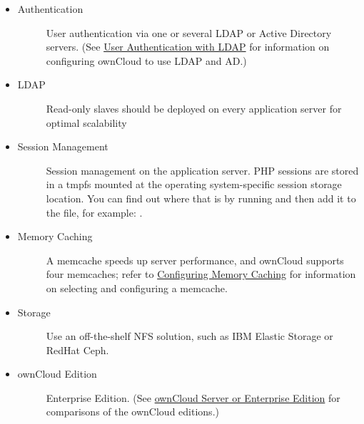 \documentclass[letterpaper,10pt,english]{sphinxmanual}
\begin{document}
\begin{itemize}
\item {} \begin{description}
\item[{Authentication}] \leavevmode
User authentication via one or several LDAP or Active Directory servers.
(See \href{https://doc.owncloud.org/server/9.0/admin\_manual/configuration\_user/user\_auth\_ldap.html}{User Authentication with LDAP}  for information on configuring
ownCloud to use LDAP and AD.)

\end{description}

\item {} \begin{description}
\item[{LDAP}] \leavevmode
Read-only slaves should be deployed on every application server for
optimal scalability

\end{description}

\item {} \begin{description}
\item[{Session Management}] \leavevmode
Session management on the application server. PHP sessions are stored
in a tmpfs mounted at the operating system-specific session storage
location. You can find out where that is by running  and then add it to the  file,
for example:
.

\end{description}

\item {} \begin{description}
\item[{Memory Caching}] \leavevmode
A memcache speeds up server performance, and ownCloud supports four
memcaches; refer to \href{https://doc.owncloud.org/server/9.0/admin\_manual/configuration\_server/caching\_configuration.html}{Configuring Memory Caching} for information on
selecting and configuring a memcache.

\end{description}

\item {} \begin{description}
\item[{Storage}] \leavevmode
Use an off-the-shelf NFS solution, such as IBM Elastic Storage or RedHat
Ceph.

\end{description}

\item {} \begin{description}
\item[{ownCloud Edition}] \leavevmode
Enterprise Edition. (See \href{https://owncloud.com/owncloud-server-or-enterprise-edition/}{ownCloud Server or Enterprise Edition} for
comparisons of the ownCloud editions.)

\end{description}

\end{itemize}
\end{document}

